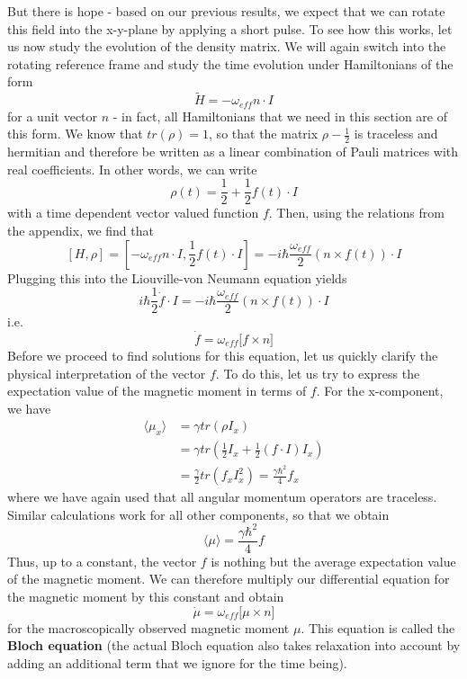 \documentclass[a4paper, draft]{article}
\theoremstyle{own}
\theoremstyle{remark}
\begin{document}
But there is hope - based on our previous results, we expect that we can rotate this field into the x-y-plane by applying a short pulse. To see how this works, let us now study the evolution of the density matrix. We will again switch into the rotating reference frame and study the time evolution under Hamiltonians of the form
$$
\widetilde{H} = - \omega_{eff} n \cdot I
$$
for a unit vector $n$ - in fact, all Hamiltonians that we need in this section are of this form. We know that $tr(\rho) = 1$, so that the matrix $\rho - \frac{1}{2}$ is traceless and hermitian and therefore be written as a linear combination of Pauli matrices with real coefficients. In other words, we can write
$$
\rho(t) = \frac{1}{2}  + \frac{1}{2} f(t) \cdot I 
$$
with a time dependent vector valued function $f$. Then, using the relations from the appendix, we find that
$$
[H,\rho] = [- \omega_{eff} n \cdot I, \frac{1}{2} f(t) \cdot I]
= - i \hbar \frac{\omega_{eff}}{2} (n \times f(t)) \cdot I
$$
Plugging this into the Liouville-von Neumann equation yields
$$
i \hbar \frac{1}{2} \dot{f} \cdot I  = - i \hbar \frac{\omega_{eff}}{2} (n \times f(t)) \cdot I
$$
i.e.
$$
\dot{f} =  \omega_{eff} \big[  f \times n \big] 
$$
Before we proceed to find solutions for this equation, let us quickly clarify the physical interpretation of the vector $f$. To do this, let us try to express the expectation value of the magnetic moment in terms of $f$. For the x-component, we have
\begin{align*}
\langle \mu_x \rangle &= \gamma tr(\rho I_x) \\ 
&= \gamma tr(\frac{1}{2} I_x + \frac{1}{2} (f \cdot I) I_x  ) \\
&= \frac{\gamma}{2} tr(f_x I_x^2) = \frac{\gamma \hbar^2}{4} f_x
\end{align*}
where we have again used that all angular momentum operators are traceless. Similar calculations work for all other components, so that we obtain
$$
\langle \mu \rangle = \frac{\gamma \hbar^2}{4} f
$$
Thus, up to a constant, the vector $f$ is nothing but the average expectation value of the magnetic moment. We can therefore multiply our differential equation for the magnetic moment by this constant and obtain
$$
\dot{\mu} = \omega_{eff} \big[ \mu \times n \big] 
$$
for the macroscopically observed magnetic moment $\mu$. This equation is called the {\bf Bloch equation} (the actual Bloch equation also takes relaxation into account by adding an additional term that we ignore for the time being).
\end{document}
